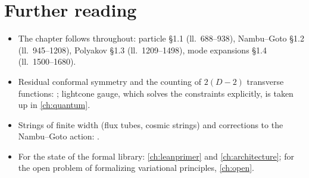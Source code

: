 \section*{Further reading}
\begin{itemize}[nosep,leftmargin=*]
\item The chapter follows  throughout: particle §1.1
(ll.~688--938), Nambu--Goto §1.2 (ll.~945--1208), Polyakov §1.3 (ll.~1209--1498), mode
expansions §1.4 (ll.~1500--1680).
\item Residual conformal symmetry and the counting of $2(D-2)$ transverse functions:
; lightcone gauge, which solves the constraints
explicitly, is taken up in \cref{ch:quantum}.
\item Strings of finite width (flux tubes, cosmic strings) and corrections to the
Nambu--Goto action: .
\item For the state of the formal library: \cref{ch:leanprimer} and \cref{ch:architecture};
for the open problem of formalizing variational principles, \cref{ch:open}.
\end{itemize}
